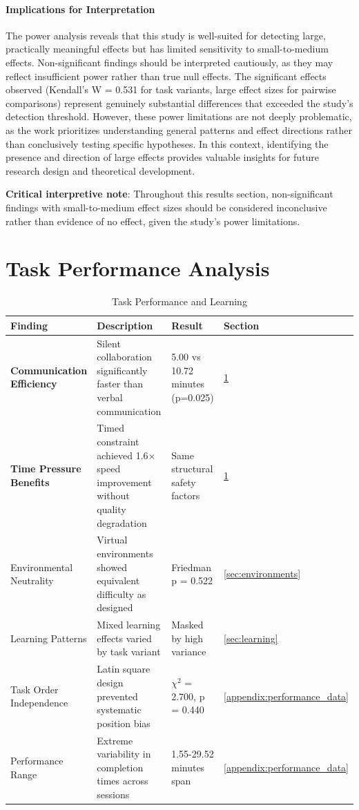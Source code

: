 \paragraph{Implications for Interpretation}
The power analysis reveals that this study is well-suited for detecting large, practically meaningful effects but has limited sensitivity to small-to-medium effects. Non-significant findings should be interpreted cautiously, as they may reflect insufficient power rather than true null effects. The significant effects observed (Kendall's W = 0.531 for task variants, large effect sizes for pairwise comparisons) represent genuinely substantial differences that exceeded the study's detection threshold. However, these power limitations are not deeply problematic, as the work prioritizes understanding general patterns and effect directions rather than conclusively testing specific hypotheses. In this context, identifying the presence and direction of large effects provides valuable insights for future research design and theoretical development.

\textbf{Critical interpretive note}: Throughout this results section, non-significant findings with small-to-medium effect sizes should be considered inconclusive rather than evidence of no effect, given the study's power limitations.

\section{Task Performance Analysis}\label{sec:task_performance}

\begin{table}[!t]
\centering
\caption{Task Performance and Learning}
\label{tab:task_performance_summary}
\begin{tabular}{@{}p{3.2cm}p{5.5cm}p{3.2cm}p{2.3cm}@{}}
\toprule
\textbf{Finding} & \textbf{Description} & \textbf{Result} & \textbf{Section} \\
\midrule
\textbf{Communication Efficiency} & Silent collaboration significantly faster than verbal communication & 5.00 vs 10.72 minutes (p=0.025) & \ref{sec:task_performance} \\
\textbf{Time Pressure Benefits} & Timed constraint achieved 1.6× speed improvement without quality degradation & Same structural safety factors & \ref{sec:task_performance} \\
Environmental Neutrality & Virtual environments showed equivalent difficulty as designed & Friedman p = 0.522 & \ref{sec:environments} \\
Learning Patterns & Mixed learning effects varied by task variant & Masked by high variance & \ref{sec:learning} \\
Task Order Independence & Latin square design prevented systematic position bias & $\chi^2$ = 2.700, p = 0.440 & \ref{appendix:performance_data} \\
Performance Range & Extreme variability in completion times across sessions & 1.55-29.52 minutes span & \ref{appendix:performance_data} \\
\bottomrule
\end{tabular}
\end{table}


